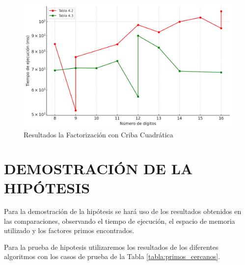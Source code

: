     \begin{figure}[H]
        \centering
        \includegraphics[width=\linewidth]{images/res-qs.png}
        \caption{Resultados la Factorización con Criba Cuadrática}
    \end{figure}


    \section{DEMOSTRACIÓN DE LA HIPÓTESIS}
    Para la demostración de la hipótesis se hará uso de los resultados obtenidos en las comparaciones, observando el tiempo de ejecución, el espacio de memoria utilizado y los factores primos encontrados.

    Para la prueba de hipotesis utilizaremos los resultados de los diferentes algoritmos con los casos de prueba de la Tabla \ref{tabla:primos_cercanos}.

